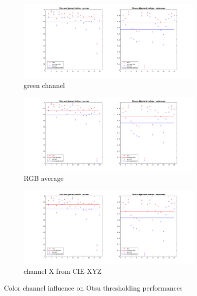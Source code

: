 \documentclass[a4paper,10pt]{article}
\begin{document}
\begin{figure}
	\begin{subfigure}{0.9\linewidth}
		\includegraphics[width=0.9\linewidth]{../results/color-channel-influence/base-evaluation/otsu-dice-jaccard-G.png}
		\caption{green channel}
		\label{fig:otsu-green}
	\end{subfigure}
	\begin{subfigure}{0.9\linewidth}
		\includegraphics[width=0.9\linewidth]{../results/color-channel-influence/base-evaluation/otsu-dice-jaccard-meanRGB.png}
		\caption{RGB average}
		\label{fig:otsu-mean}
	\end{subfigure}
	\begin{subfigure}{0.9\linewidth}
		\includegraphics[width=0.9\linewidth]{../results/color-channel-influence/base-evaluation/otsu-dice-jaccard-X.png}
		\caption{channel X from CIE-XYZ}
		\label{fig:otsu-X}
	\end{subfigure}
	
	\caption{Color channel influence on Otsu thresholding performances}
	\label{fig:color-channel-otsu2}
\end{figure} 
\end{document}
